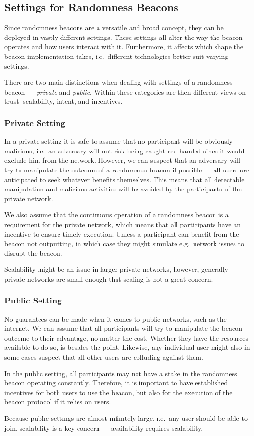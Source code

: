 \subsection{Settings for Randomness Beacons}
Since randomness beacons are a versatile and broad concept, they can be deployed in vastly different settings.
These settings all alter the way the beacon operates and how users interact with it.
Furthermore, it affects which shape the beacon implementation takes, i.e.\ different technologies better suit varying settings.

There are two main distinctions when dealing with settings of a randomness beacon --- \emph{private} and \emph{public}.
Within these categories are then different views on trust, scalability, intent, and incentives.

\subsubsection{Private Setting}
In a private setting it is safe to assume that no participant will be obviously malicious, i.e.\ an adversary will not risk being caught red-handed since it would exclude him from the network.
However, we can suspect that an adversary will try to manipulate the outcome of a randomness beacon if possible --- all users are anticipated to seek whatever benefits themselves.
This means that all detectable manipulation and malicious activities will be avoided by the participants of the private network.

We also assume that the continuous operation of a randomness beacon is a requirement for the private network, which means that all participants have an incentive to ensure timely execution.
Unless a participant can benefit from the beacon not outputting, in which case they might simulate e.g.\ network issues to disrupt the beacon.

Scalability might be an issue in larger private networks, however, generally private networks are small enough that scaling is not a great concern.

\subsubsection{Public Setting}
No guarantees can be made when it comes to public networks, such as the internet.
We can assume that all participants will try to manipulate the beacon outcome to their advantage, no matter the cost.
Whether they have the resources available to do so, is besides the point.
Likewise, any individual user might also in some cases suspect that all other users are colluding against them.

In the public setting, all participants may not have a stake in the randomness beacon operating constantly.
Therefore, it is important to have established incentives for both users to use the beacon, but also for the execution of the beacon protocol if it relies on users.

Because public settings are almost infinitely large, i.e.\ any user should be able to join, scalability is a key concern --- availability requires scalability.


